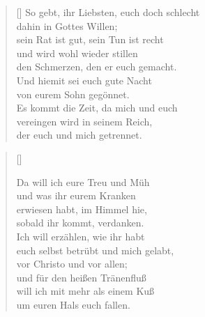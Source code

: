 \begin{multicols}{2}
\begin{verse}[\versewidth]
 So gebt, ihr Liebsten, euch doch schlecht\\
dahin in Gottes Willen;\\
sein Rat ist gut, sein Tun ist recht\\
und wird wohl wieder stillen\\
den Schmerzen, den er euch gemacht.\\
Und hiemit sei euch gute Nacht\\
von eurem Sohn gegönnet.\\
Es kommt die Zeit, da mich und euch\\
vereingen wird in seinem Reich,\\
der euch und mich getrennet.

\end{verse}
\end{multicols}

\begin{center}
\settowidth{\versewidth}{Der, vor dem die Welt erschrickt,}
\begin{verse}[\versewidth]


 Da will ich eure Treu und Müh\\
und was ihr eurem Kranken\\
erwiesen habt, im Himmel hie,\\
sobald ihr kommt, verdanken.\\
Ich will erzählen, wie ihr habt\\
euch selbst betrübt und mich gelabt,\\
vor Christo und vor allen;\\
und für den heißen Tränenfluß\\
will ich mit mehr als einem Kuß\\
um euren Hals euch fallen.

\end{verse}
\end{center}


